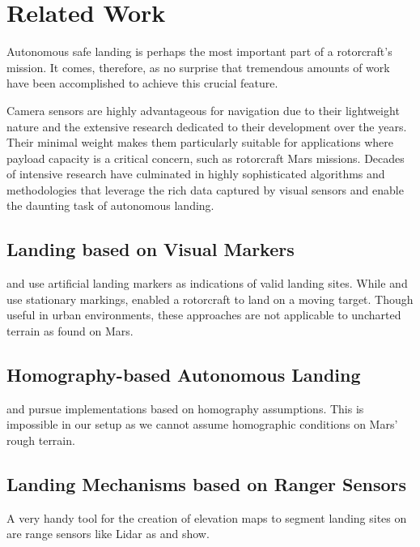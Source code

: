 \chapter{Related Work}
\label{sec:relwork}


Autonomous safe landing is perhaps the most important part of a rotorcraft's mission. It comes, therefore, as no surprise that tremendous amounts of work have been accomplished to achieve this crucial feature. 

Camera sensors are highly advantageous for navigation due to their lightweight nature and the extensive research dedicated to their development over the years. Their minimal weight makes them particularly suitable for applications where payload capacity is a critical concern, such as rotorcraft Mars missions. Decades of intensive research have culminated in highly sophisticated algorithms and methodologies that leverage the rich data captured by visual sensors and enable the daunting task of autonomous landing.

\section{Landing based on Visual Markers}
\citep{Saripalli2002VisionBasedLanding,Falanga2017QuadrotorLanding} and \citep{Mu2023VisionBasedLanding} use artificial landing markers as indications of valid landing sites. While \citep{Saripalli2002VisionBasedLanding} and \citep{Mu2023VisionBasedLanding} use stationary markings, \citep{Falanga2017QuadrotorLanding} enabled a rotorcraft to land on a moving target. Though useful in urban environments, these approaches are not applicable to uncharted terrain as found on Mars.

\section{Homography-based Autonomous Landing}

\citep{Bosch2006AutonomousDetection,Brockers2011AutonomousLanding,Desaraju2015VisionBased} and \citep{Brockers2014TowardsAutonomous} pursue implementations based on homography assumptions. This is impossible in our setup as we cannot assume homographic conditions on Mars' rough terrain. %

\section{Landing Mechanisms based on Ranger Sensors}
A very handy tool for the creation of elevation maps to segment landing sites on are range sensors like Lidar as \citep{Trawny2015FlightTesting, Luna2017Evaluation, Johnson2002LidarBased} and \citep{Scherer2012AutonomousLanding} show. 

